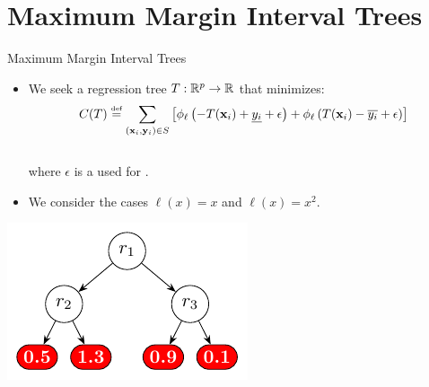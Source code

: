 \documentclass{beamer}
\newcommand{\ylower}[1]{\ensuremath{\underline{y_{#1}}}}
\newcommand{\yupper}[1]{\ensuremath{\overline{y_{#1}}}}
\begin{document}
\section{Maximum Margin Interval Trees}


\begin{frame}{Maximum Margin Interval Trees}
	\begin{itemize}
		\item<+-> We seek a regression tree $T: \mathbb{R}^p \rightarrow \mathbb{R}$ that minimizes:
		\begin{equation*}
		C(T) \eqdef \sum_{(\xb_i, \yb_i) \in S} \left[ \phi_\ell \left( - T(\xb_i) + \ylower{i} + \epsilon \right) + \phi_\ell \left(T(\xb_i) - \yupper{i} + \epsilon \right) \right]
		\end{equation*}\\[-2mm]
		where $\epsilon$ is a  used for .
		\vspace{5mm}
		\item<+-> We consider the cases $\ell(x) = x$ and $\ell(x) = x^2$.
	\end{itemize}
	\begin{center}
		\includegraphics[scale=1.1]{figures/regression_tree/regression_tree.pdf}
	\end{center}
\end{frame}
\end{document}
